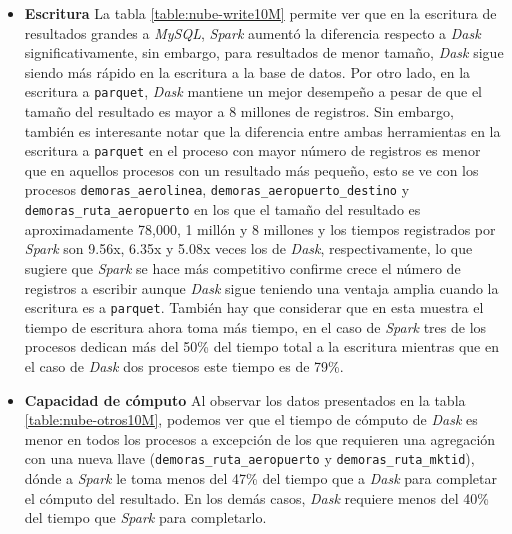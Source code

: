 \begin{itemize}
	\item \textbf{Escritura} La tabla \ref{table:nube-write10M} permite ver que en la escritura de resultados grandes a \textit{MySQL}, \textit{Spark} aumentó la diferencia respecto a \textit{Dask} significativamente, sin embargo, para resultados de menor tamaño, \textit{Dask} sigue siendo más rápido en la escritura a la base de datos. Por otro lado, en la escritura a \texttt{parquet}, \textit{Dask} mantiene un mejor desempeño a pesar de que el tamaño del resultado es mayor a 8 millones de registros. Sin embargo, también es interesante notar que la diferencia entre ambas herramientas en la escritura a \texttt{parquet} en el proceso con mayor número de registros es menor que en aquellos procesos con un resultado más pequeño, esto se ve con los procesos  \texttt{demoras\_aerolinea}, \texttt{demoras\_aeropuerto\_destino} y \texttt{demoras\_ruta\_aeropuerto} en los que el tamaño del resultado es aproximadamente 78,000, 1 millón y 8 millones y los tiempos registrados por \textit{Spark} son 9.56x, 6.35x y 5.08x veces los de \textit{Dask}, respectivamente, lo que sugiere que \textit{Spark} se hace más competitivo confirme crece el número de registros a escribir aunque \textit{Dask} sigue teniendo una ventaja amplia cuando la escritura es a \texttt{parquet}. También hay que considerar que en esta muestra el tiempo de escritura ahora toma más tiempo, en el caso de \textit{Spark} tres de los procesos dedican más del 50\% del tiempo total a la escritura mientras que en el caso de \textit{Dask} dos procesos este tiempo es de 79\%.
	
	\item \textbf{Capacidad de cómputo} Al observar los datos presentados en la tabla \ref{table:nube-otros10M}, podemos ver que el tiempo de cómputo de \textit{Dask} es menor en todos los procesos a excepción de los que requieren una agregación con una nueva llave (\texttt{demoras\_ruta\_aeropuerto} y \texttt{demoras\_ruta\_mktid}), dónde a \textit{Spark} le toma menos del 47\% del tiempo que a \textit{Dask} para completar el cómputo del resultado. En los demás casos, \textit{Dask} requiere menos del 40\% del tiempo que \textit{Spark} para completarlo. 
	

\end{itemize}
